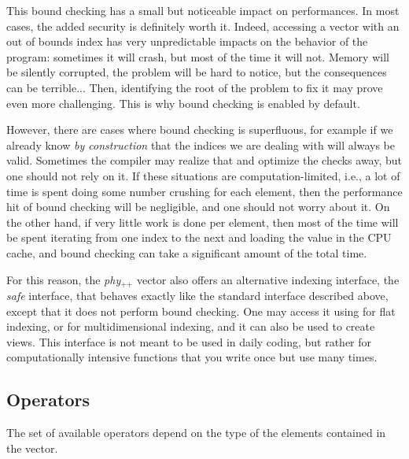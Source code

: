 \documentclass[12pt]{report}
\newcommand{\phypp}{\textit{phy}$_{\text{++}}$\xspace}
\newenvironment{advanced}
{
    \begin{mdframed}[style=advanced,frametitle={Advanced}]
}
{
    \end{mdframed}
}
\begin{document}
\begin{advanced}
This bound checking has a small but noticeable impact on performances. In most cases, the added security is definitely worth it. Indeed, accessing a vector with an out of bounds index has very unpredictable impacts on the behavior of the program: sometimes it will crash, but most of the time it will not. Memory will be silently corrupted, the problem will be hard to notice, but the consequences can be terrible... Then, identifying the root of the problem to fix it may prove even more challenging. This is why bound checking is enabled by default.

However, there are cases where bound checking is superfluous, for example if we already know \emph{by construction} that the indices we are dealing with will always be valid. Sometimes the compiler may realize that and optimize the checks away, but one should not rely on it. If these situations are computation-limited, i.e., a lot of time is spent doing some number crushing for each element, then the performance hit of bound checking will be negligible, and one should not worry about it. On the other hand, if very little work is done per element, then most of the time will be spent iterating from one index to the next and loading the value in the CPU cache, and bound checking can take a significant amount of the total time.

For this reason, the \phypp vector also offers an alternative indexing interface, the \emph{safe} interface, that behaves exactly like the standard interface described above, except that it does not perform bound checking. One may access it using  for flat indexing, or  for multidimensional indexing, and it can also be used to create views. This interface is not meant to be used in daily coding, but rather for computationally intensive functions that you write once but use many times.
\end{advanced}

\subsection{Operators \label{SEC:core:vec:operator}}

The set of available operators depend on the type of the elements contained in the vector.
\end{document}
